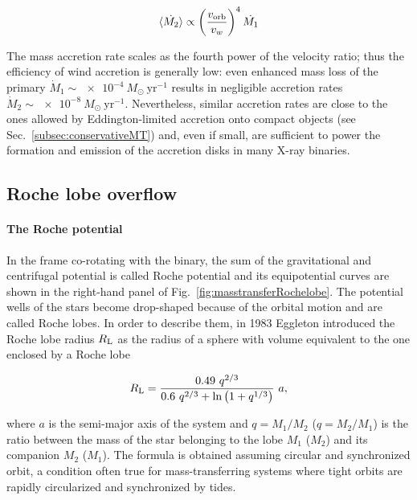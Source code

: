 \documentclass[a4paper,titlepage]{book}     	%
\newcommand{\sun}{\ensuremath{_\odot}}
\newcommand{\mdot}{\ensuremath{\dot{M}}}
\newcommand{\msun}{\ensuremath{M\sun}}
\newcommand{\yr}{\text{yr}}
\newcommand{\rl}{\ensuremath{R_\textup{L}}}
\begin{document}
\begin{equation}\label{eq:windfedaccretion}
\langle \dot{M_2} \rangle \propto \left(\frac{v_\textup{orb}}{v_w}\right)^4 \dot{M_1}
\end{equation}

The mass accretion rate scales as the fourth power of the velocity ratio; thus the efficiency of wind accretion is generally low: even enhanced mass loss of the primary $\mdot_1 \sim \SI{e-4}{\msun~\yr^{-1}}$ results in negligible accretion rates $\mdot_2 \sim \SI{e-8}{\msun~\yr^{-1}}$. Nevertheless, similar accretion rates are close to the ones allowed by Eddington-limited accretion onto compact objects (see Sec.\ \ref{subsec:conservativeMT}) and, even if small, are sufficient to power the formation and emission of the accretion disks in many X-ray binaries.

\subsection{Roche lobe overflow}\label{subsec:Rochelobeoverflow}
\paragraph{The Roche potential}
In the frame co-rotating with the binary, the sum of the gravitational and centrifugal potential is called Roche potential and its equipotential curves are shown in the right-hand panel of Fig.\ \ref{fig:masstransferRochelobe}. The potential wells of the stars become drop-shaped because of the orbital motion and are called Roche lobes. In order to describe them, in 1983 Eggleton \cite{Eggleton1983} introduced the Roche lobe radius $\rl$ as the radius of a sphere with volume equivalent to the one enclosed by a Roche lobe 

\begin{equation}\label{eq:rocheloberadius}
\rl = \frac{0.49~q^{2/3}}{0.6~q^{2/3} + \ln \left(1+q^{1/3}\right)}~a,
\end{equation}

where $a$ is the semi-major axis of the system and $q=M_1/M_2$ ($q=M_2/M_1$) is the ratio between the mass of the star belonging to the lobe $M_1$ ($M_2$) and its companion $M_2$ ($M_1$). The formula is obtained assuming circular and synchronized orbit, a condition often true for mass-transferring systems where tight orbits are rapidly circularized and synchronized by tides.
\end{document}
